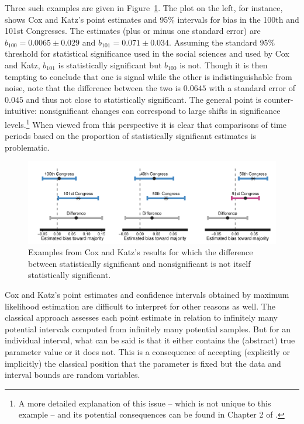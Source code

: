 Three such examples are given in Figure~\ref{fig:ck_signif}. The plot on the left, for instance, 
shows Cox and Katz's point estimates and 95\% intervals for bias in the 100th and 101st 
Congresses. The estimates (plus or minus one standard error) are $b_{100} = 0.0065 \pm 0.029$ 
and $b_{101} = 0.071 \pm 0.034$. Assuming the standard 95\% threshold for statistical significance 
used in the social sciences and used by Cox and Katz, $b_{101}$ is statistically significant 
but $b_{100}$ is not. Though it is then tempting to conclude that one is signal while the other 
is indistinguishable from noise, note that the difference between the two is 
$0.0645$ with a standard error of $0.045$ and thus not close to statistically significant. 
The general point is counter-intuitive: nonsignificant changes can correspond to large shifts 
in significance levels.\footnote{A more detailed explanation of this issue -- which is not unique to this 
example -- and its potential consequences can be found in Chapter 2 of 
.} When viewed from this perspective it is clear that comparisons of 
time periods based on the proportion of statistically significant estimates is problematic. 

\begin{figure}
\centering
\includegraphics[scale=0.75]{sections/figs/ck_signif_all}%
\caption{Examples from Cox and Katz's results for which the difference between statistically 
significant and nonsignificant is not itself statistically significant.}
\label{fig:ck_signif}
\end{figure}

Cox and Katz's point estimates and confidence intervals obtained by maximum likelihood estimation 
are difficult to interpret for other reasons as well. The classical approach assesses each point estimate 
in relation to infinitely many potential intervals computed from infinitely many potential samples. But for 
an individual interval, what can be said is that it either contains the (abstract) true parameter value or it 
does not. This is a consequence of accepting (explicitly or implicitly) the classical position that the 
parameter is fixed but the data and interval bounds are random variables. 

